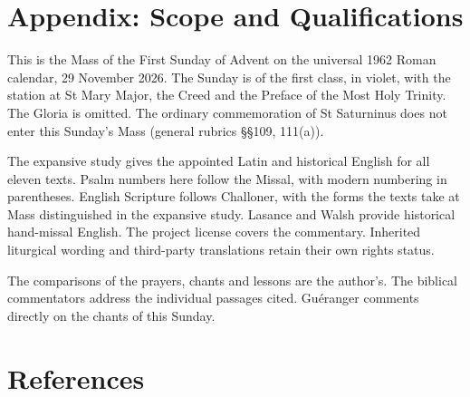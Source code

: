 \section{Appendix: Scope and Qualifications}

This is the Mass of the First Sunday of Advent on the universal 1962 Roman calendar, 29 November 2026. The Sunday is of the first class, in violet, with the station at St Mary Major, the Creed and the Preface of the Most Holy Trinity. The Gloria is omitted. The ordinary commemoration of St Saturninus does not enter this Sunday's Mass (general rubrics §§109, 111(a)).

The expansive study gives the appointed Latin and historical English for all eleven texts. Psalm numbers here follow the Missal, with modern numbering in parentheses. English Scripture follows Challoner, with the forms the texts take at Mass distinguished in the expansive study. Lasance and Walsh provide historical hand-missal English. The project license covers the commentary. Inherited liturgical wording and third-party translations retain their own rights status.

The comparisons of the prayers, chants and lessons are the author's. The biblical commentators address the individual passages cited. Guéranger comments directly on the chants of this Sunday.

\section{References}

